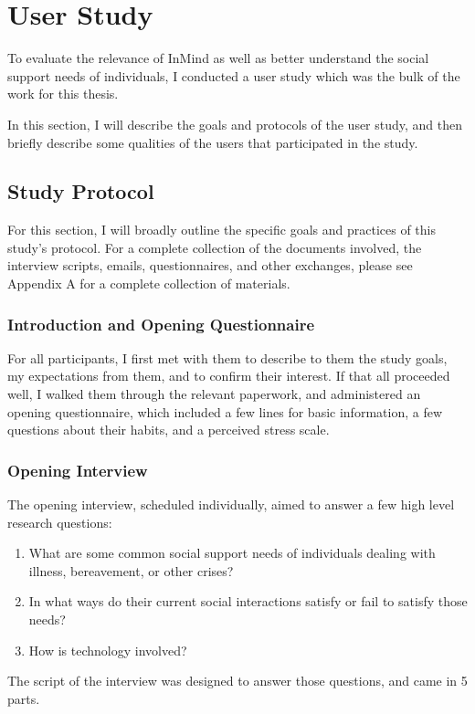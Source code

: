 \chapter{User Study}
To evaluate the relevance of InMind as well as better understand
the social support needs of individuals,
I conducted a user study which was the bulk of the work for this thesis.

In this section, I will describe the goals and protocols of the user study,
and then briefly describe some qualities of the users that participated
in the study.

\section{Study Protocol}
  For this section, I will broadly outline the specific goals
  and practices of this study's protocol.
  For a complete collection of the documents involved,
  the interview scripts, emails, questionnaires, and other exchanges,
  please see Appendix A for a complete collection of materials.

  \subsection{Introduction and Opening Questionnaire}
  For all participants,
  I first met with them to describe to them the study goals,
  my expectations from them, and to confirm their interest.
  If that all proceeded well, I walked them through the relevant paperwork,
  and administered an opening questionnaire,
  which included a few lines for basic information,
  a few questions about their habits,
  and a perceived stress scale.
  
  \subsection{Opening Interview}
  The opening interview, scheduled individually,
  aimed to answer a few high level research questions:
  \begin{enumerate}
  \item What are some common social support needs of individuals
  dealing with illness, bereavement, or other crises?
  \item In what ways do their current social interactions satisfy
  or fail to satisfy those needs?
  \item How is technology involved?
  \end{enumerate}

  The script of the interview was designed to answer those questions,
  and came in 5 parts.

